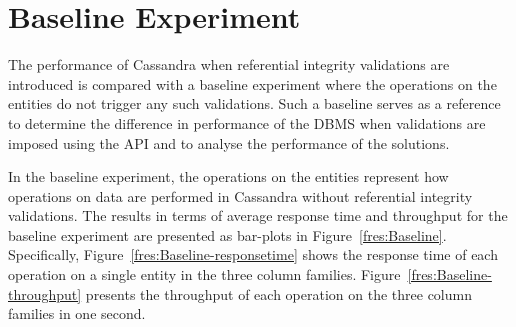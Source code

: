 \section{Baseline Experiment} \label{s:results-Baseline}

The performance of Cassandra when referential
integrity validations are introduced  is compared with
 a baseline experiment where the operations on the entities do not trigger any
such validations.  Such a baseline serves as a reference to determine the
difference in performance of the \ac{DBMS} when validations are imposed using
the \ac{API} and to analyse the performance of the solutions. 

In the baseline experiment,  the operations on the entities represent how
operations on data are performed in Cassandra without referential integrity
validations. 
The results in terms of average response time and throughput for the baseline
experiment are presented as  bar-plots in Figure~\ref{fres:Baseline}. 
Specifically,  Figure~\ref{fres:Baseline-responsetime} shows the response time 
of each operation on a single entity in the three column families. 
Figure~\ref{fres:Baseline-throughput} presents the throughput of each operation
on the three column families in one second. 

	
